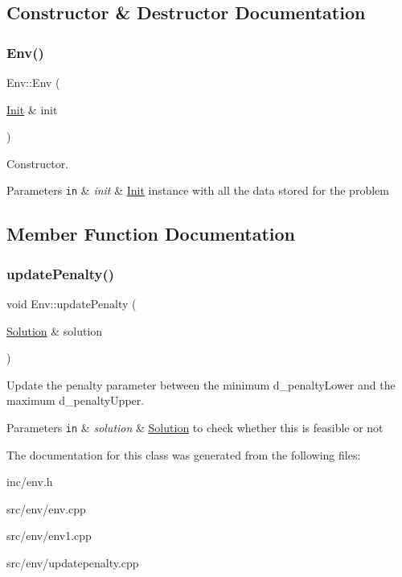 \subsection{Constructor \& Destructor Documentation}
\mbox{\label{class_env_abef807205f56ffe87706b5413c0de75f}} 
\subsubsection{\texorpdfstring{Env()}{Env()}}
{\footnotesize\ttfamily Env\+::\+Env (\begin{DoxyParamCaption}\item[{\hyperlink{class_init}{Init} \&}]{init }\end{DoxyParamCaption})}



Constructor. 


\begin{DoxyParams}[1]{Parameters}
\mbox{\tt in}  & {\em init} & \hyperlink{class_init}{Init} instance with all the data stored for the problem \\
\hline
\end{DoxyParams}


\subsection{Member Function Documentation}
\mbox{\label{class_env_a05decf6ad0f2370b38fd8c403777a9ca}} 
\subsubsection{\texorpdfstring{update\+Penalty()}{updatePenalty()}}
{\footnotesize\ttfamily void Env\+::update\+Penalty (\begin{DoxyParamCaption}\item[{\hyperlink{class_solution}{Solution} \&}]{solution }\end{DoxyParamCaption})}



Update the penalty parameter between the minimum d\+\_\+penalty\+Lower and the maximum d\+\_\+penalty\+Upper. 


\begin{DoxyParams}[1]{Parameters}
\mbox{\tt in}  & {\em solution} & \hyperlink{class_solution}{Solution} to check whether this is feasible or not \\
\hline
\end{DoxyParams}


The documentation for this class was generated from the following files\+:\begin{DoxyCompactItemize}
\item 
inc/env.\+h\item 
src/env/env.\+cpp\item 
src/env/env1.\+cpp\item 
src/env/updatepenalty.\+cpp\end{DoxyCompactItemize}
